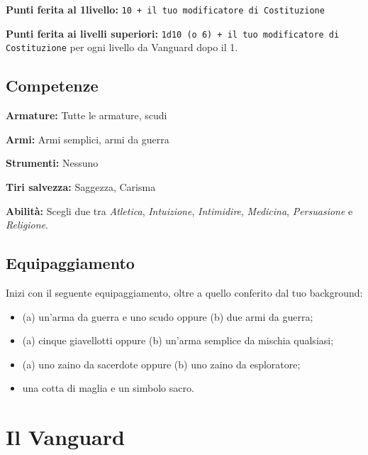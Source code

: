 \documentclass[a4paper,10pt,twoside,twocolumn,openany,bg=full,nodeprecatedcode]{dndbook}
\begin{document}
\textbf{Punti ferita al 1\degree livello:} \texttt{10 + il tuo modificatore di Costituzione}

\textbf{Punti ferita ai livelli superiori:} \texttt{1d10 (o 6) + il tuo modificatore di Costituzione} per ogni livello da Vanguard dopo il 1\degree.

\subsection{Competenze}

\textbf{Armature:} Tutte le armature, scudi

\textbf{Armi:} Armi semplici, armi da guerra

\textbf{Strumenti:} Nessuno

\textbf{Tiri salvezza:} Saggezza, Carisma

\textbf{Abilità:} Scegli due tra \emph{Atletica}, \emph{Intuizione}, \emph{Intimidire}, \emph{Medicina}, \emph{Persuasione} e \emph{Religione}.

\subsection{Equipaggiamento}

Inizi con il seguente equipaggiamento, oltre a quello conferito dal tuo background:

\begin{itemize}
  \item (a) un'arma da guerra e uno scudo oppure (b) due armi da guerra;
  \item (a) cinque giavellotti oppure (b) un'arma semplice da mischia qualsiasi;
  \item (a) uno zaino da sacerdote oppure (b) uno zaino da esploratore;
  \item una cotta di maglia e un simbolo sacro.
\end{itemize}

\section{Il Vanguard}
\end{document}
